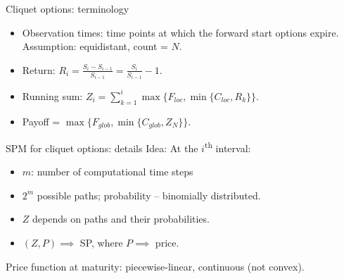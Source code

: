 \documentclass[utf8,t,xcolor=svgnames]{beamer}
\begin{document}
\begin{frame}{Cliquet options: terminology}
	\begin{itemize}
		\item Observation times: time points at which the forward start options expire. Assumption: equidistant, count = $ N $.
		\item Return: $ R_i = \frac{S_i - S_{i-1}}{S_{i-1}} = \frac{S_i}{S_{i-1}} - 1 $.
		\item Running sum: $ Z_i = \sum_{k = 1}^{i} \max \{ F_{loc}, \min \{ C_{loc}, R_k \} \} $.
		\item Payoff = $ \max \{ F_{glob}, \min \{ C_{glob}, Z_{N} \} \} $.
	\end{itemize}
\end{frame}


\begin{frame}{SPM for cliquet options: details}
	Idea: At the $ i $\textsuperscript{th} interval:
	\begin{itemize}
		\item $ m $: number of computational time steps
		\item $ 2^m $ possible paths; probability -- binomially distributed.
		\item $ Z $ depends on paths and their probabilities.
		\item $ (Z, P) \implies $ SP, where $ P \implies $ price.
	\end{itemize}
	Price function at maturity: piecewise-linear, continuous (not convex).
	

\end{frame}
\end{document}
